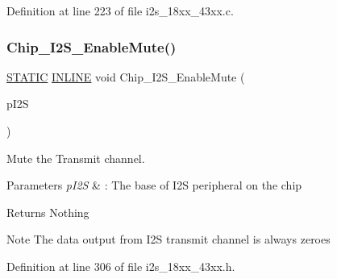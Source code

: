 Definition at line 223 of file i2s\+\_\+18xx\+\_\+43xx.\+c.

\mbox{\label{group___i2_s__18_x_x__43_x_x_ga3977adf6afb42ea9da7c764ef36efa6e}} 
\subsubsection{\texorpdfstring{Chip\+\_\+\+I2\+S\+\_\+\+Enable\+Mute()}{Chip\_I2S\_EnableMute()}}
{\footnotesize\ttfamily \hyperlink{group___l_p_c___types___public___macros_ga10b2d890d871e1489bb02b7e70d9bdfb}{S\+T\+A\+T\+IC} \hyperlink{spifi__18xx__43xx_8h_a2eb6f9e0395b47b8d5e3eeae4fe0c116}{I\+N\+L\+I\+NE} void Chip\+\_\+\+I2\+S\+\_\+\+Enable\+Mute (\begin{DoxyParamCaption}\item[{\hyperlink{struct_l_p_c___i2_s___t}{L\+P\+C\+\_\+\+I2\+S\+\_\+T} $\ast$}]{p\+I2S }\end{DoxyParamCaption})}



Mute the Transmit channel. 


\begin{DoxyParams}{Parameters}
{\em p\+I2S} & \+: The base of I2S peripheral on the chip \\
\hline
\end{DoxyParams}
\begin{DoxyReturn}{Returns}
Nothing 
\end{DoxyReturn}
\begin{DoxyNote}{Note}
The data output from I2S transmit channel is always zeroes 
\end{DoxyNote}


Definition at line 306 of file i2s\+\_\+18xx\+\_\+43xx.\+h.

\mbox{\label{group___i2_s__18_x_x__43_x_x_ga5880b341bea64ea33e734af422b43dc3}} 
